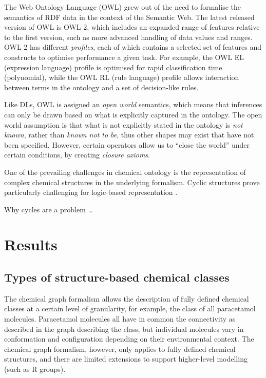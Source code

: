 \documentclass[10pt]{bmc_article}
\newenvironment{bmcformat}{\baselineskip20pt\sloppy\setboolean{publ}{false}}{\baselineskip20pt\sloppy}
\begin{document}
\begin{bmcformat}
The Web Ontology Language (OWL) grew out of the need to formalise the semantics of RDF data in the context of the Semantic Web.  The latest released version of OWL is OWL 2, which includes an expanded range of features relative to the first version, such as more advanced handling of data values and ranges. OWL 2 has different \textit{profiles}, each of which contains a selected set of features and constructs to optimise performance a given task.  For example, the OWL EL (expression language) profile is optimised for rapid classification time (polynomial), while the OWL RL (rule language) profile allows interaction between terms in the ontology and a set of decision-like rules.   

Like DLs, OWL is assigned an \textit{open world} semantics, which means that inferences can only be drawn based on what is explicitly captured in the ontology. The open world assumption is that what is not explicitly stated in the ontology is \textit{not known}, rather than \textit{known not to be}, thus other shapes may exist that have not been specified. However, certain operators allow us to ``close the world'' under certain conditions, by creating \textit{closure axioms}. 

One of the prevailing challenges in chemical ontology is the representation of complex chemical structures in the underlying formalism. Cyclic structures prove particularly challenging for logic-based representation \cite{magka2010}.  

Why cycles are a problem \ldots




\section*{Results}

\subsection*{Types of structure-based chemical classes}
\label{sec:resultsclasses}

The chemical graph formalism \cite{trinajstic1992} allows the description of fully defined chemical classes at a certain level of granularity, for example, the class of all paracetamol molecules.  Paracetamol molecules all have in common the connectivity as described in the graph describing the class, but individual molecules vary in conformation and configuration depending on their environmental context. The chemical graph formalism, however, only applies to fully defined chemical structures, and there are limited extensions to support higher-level modelling (such as R groups). 


\end{bmcformat}
\end{document}
